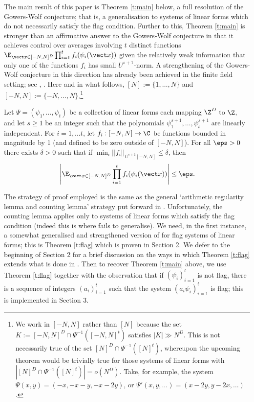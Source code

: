 The main result of this paper is Theorem \ref{t:main} below, a full resolution of the Gowers-Wolf conjecture; that is, a generalisation \cite[Theorem 1.13]{GT10} to systems of linear forms which do not necessarily satisfy the flag condition. Further to this, Theorem \ref{t:main} is stronger than an affirmative answer to the Gowers-Wolf conjecture in that it achieves control over averages involving $t$ distinct functions $\E_{\vect x \in [-N,N]^D} \prod_{i=1}^t f_i(\psi_i(\vect x))$  given the relatively weak information that only one of the functions $f_i$ has small $U^{s+1}$-norm.  A strengthening of the Gowers-Wolf conjecture in this direction has already been achieved in the finite field setting; see \cite{HL11}, \cite{HHL16}. Here and in what follows, $[N]:= \{1,\ldots,N\}$ and $[-N,N]:= \{ -N, \ldots, N\}$.\footnote{We work in $[-N,N]$ rather than $[N]$ because the set $K:=[-N,N]^D \cap \Psi^{-1}([-N,N]^t)$ satisfies $|K| \gg N^D$. This is not necessarily true of the set $[N]^D \cap \Psi^{-1}([N]^t)$, whereupon the upcoming theorem would be trivially true for those systems of linear forms with $|[N]^D \cap \Psi^{-1}([N]^t)| = o(N^D)$. Take, for example, the system $\Psi(x,y) = (-x,-x-y,-x-2y)$, or $\Psi'(x,y,\ldots) = (x-2y,y-2x,\ldots)$.}  

\begin{thm}\label{t:main}
Let $\Psi = (\psi_1, \ldots, \psi_t)$ be a collection of linear forms each mapping $\Z^D$ to $\Z$, and let $s \geq 1$ be an integer such that the polynomials $\psi_1^{s+1},\ldots,\psi_t^{s+1}$ are linearly independent. For $i=1, \ldots t$,  let $f_i:[-N,N] \to \C$ be functions bounded in magnitude by 1 (and defined to be zero outside of $[-N,N]$). For all $\eps >0$ there exists $\delta>0$ such that if $\min_{i} ||f_i||_{U^{s+1}[-N,N]} \leq \delta$, then 
\[\left|\E_{\vect x \in [-N,N]^D} \prod_{i=1}^t f_i(\psi_i(\vect x))\right| \leq \eps.\] 
\end{thm}

The strategy of proof employed is the same as the general `arithmetic regularity lemma and counting lemma' strategy put forward in \cite{GT10}. Unfortunately, the counting lemma \cite[Theorem 1.11]{GT10} applies only to systems of linear forms which satisfy the flag condition (indeed this is where \cite[Theorem 1.13]{GT20} fails to generalise). We need, in the first instance, a somewhat generalised and strengthened version of \cite[Theorem 1.13]{GT20} for flag systems of linear forms; this is Theorem \ref{t:flag} which is proven in Section 2. We defer to the beginning of Section 2 for a brief discussion on the ways in which Theorem \ref{t:flag} extends what is done in \cite[Theorem 1.13]{GT20}.  Then to recover Theorem \ref{t:main} above, we use Theorem \ref{t:flag} together with the observation that if $(\psi_i)_{i=1}^t$ is not flag, there is a sequence of integers $(a_i)_{i=1}^t$ such that the system $(a_i\psi_i)_{i=1}^t$ is flag; this is implemented in Section 3. 




